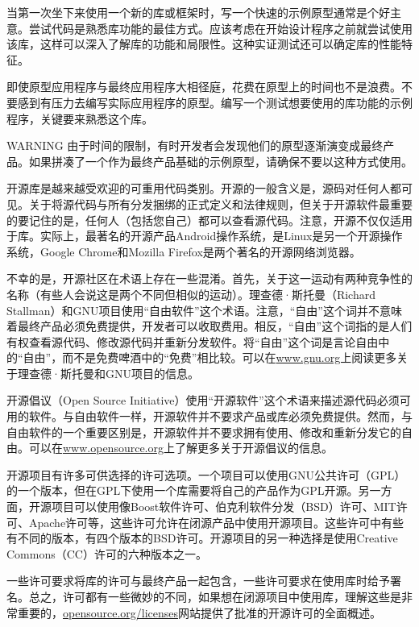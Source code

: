 
当第一次坐下来使用一个新的库或框架时，写一个快速的示例原型通常是个好主意。尝试代码是熟悉库功能的最佳方式。应该考虑在开始设计程序之前就尝试使用该库，这样可以深入了解库的功能和局限性。这种实证测试还可以确定库的性能特征。

即使原型应用程序与最终应用程序大相径庭，花费在原型上的时间也不是浪费。不要感到有压力去编写实际应用程序的原型。编写一个测试想要使用的库功能的示例程序，关键要来熟悉这个库。

\begin{myWarning}{WARNING}
由于时间的限制，有时开发者会发现他们的原型逐渐演变成最终产品。如果拼凑了一个作为最终产品基础的示例原型，请确保不要以这种方式使用。
\end{myWarning}


开源库是越来越受欢迎的可重用代码类别。开源的一般含义是，源码对任何人都可见。关于将源代码与所有分发捆绑的正式定义和法律规则，但关于开源软件最重要的要记住的是，任何人（包括您自己）都可以查看源代码。注意，开源不仅仅适用于库。实际上，最著名的开源产品Android操作系统，是Linux是另一个开源操作系统，Google Chrome和Mozilla Firefox是两个著名的开源网络浏览器。


不幸的是，开源社区在术语上存在一些混淆。首先，关于这一运动有两种竞争性的名称（有些人会说这是两个不同但相似的运动）。理查德·斯托曼（Richard Stallman）和GNU项目使用“自由软件”这个术语。注意，“自由”这个词并不意味着最终产品必须免费提供，开发者可以收取费用。相反，“自由”这个词指的是人们有权查看源代码、修改源代码并重新分发软件。将“自由”这个词是言论自由中的“自由”，而不是免费啤酒中的“免费”相比较。可以在\url{www.gnu.org}上阅读更多关于理查德·斯托曼和GNU项目的信息。

开源倡议（Open Source Initiative）使用“开源软件”这个术语来描述源代码必须可用的软件。与自由软件一样，开源软件并不要求产品或库必须免费提供。然而，与自由软件的一个重要区别是，开源软件并不要求拥有使用、修改和重新分发它的自由。可以在\url{www.opensource.org}上了解更多关于开源倡议的信息。

开源项目有许多可供选择的许可选项。一个项目可以使用GNU公共许可（GPL）的一个版本，但在GPL下使用一个库需要将自己的产品作为GPL开源。另一方面，开源项目可以使用像Boost软件许可、伯克利软件分发（BSD）许可、MIT许可、Apache许可等，这些许可允许在闭源产品中使用开源项目。这些许可中有些有不同的版本，有四个版本的BSD许可。开源项目的另一种选择是使用Creative Commons（CC）许可的六种版本之一。

一些许可要求将库的许可与最终产品一起包含，一些许可要求在使用库时给予署名。总之，许可都有一些微妙的不同，如果想在闭源项目中使用库，理解这些是非常重要的，\url{opensource.org/licenses}网站提供了批准的开源许可的全面概述。

